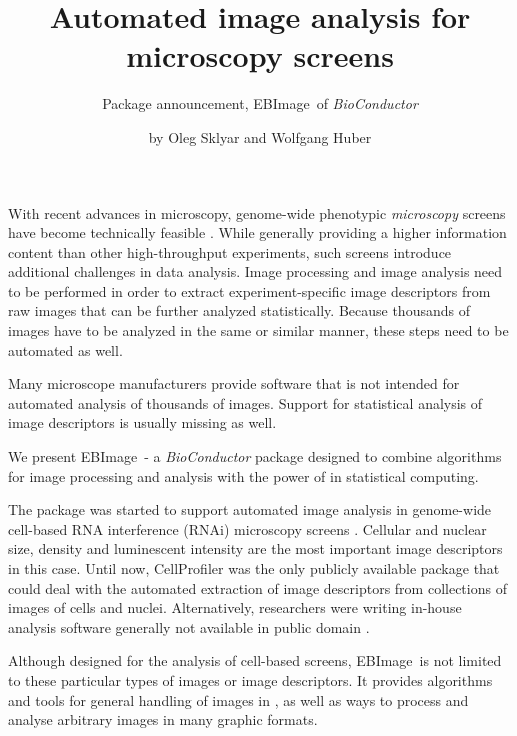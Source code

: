 
\newcommand{\lib}[1]{{\normalfont\textsf{#1}}}
\newcommand{\EBImage}{{\normalfont\textsf{EBImage}}}

\title{Automated image analysis for microscopy screens}
\subtitle{Package announcement, \EBImage\ of {\em BioConductor}}
\author{by Oleg Sklyar and Wolfgang Huber}

\maketitle

With recent advances in microscopy, genome-wide phenotypic {\em microscopy} screens have become technically feasible \citep{R:Neumann:2006}. While generally providing a higher information content than other high-throughput experiments, such screens introduce additional challenges in data analysis. Image processing and image analysis need to be performed in order to extract experiment-specific image descriptors from raw images that can be further analyzed statistically. Because thousands of images have to be analyzed in the same or similar manner, these steps need to be automated as well.

Many microscope manufacturers provide software that is not intended for automated analysis of thousands of images. Support for statistical analysis of image descriptors is usually missing as well.

We present \EBImage\ - a {\em BioConductor} package designed to combine algorithms for image processing and analysis with the power of \R{} in statistical computing.

The package was started to support automated image analysis in genome-wide cell-based RNA interference (RNAi) microscopy screens \citep{R:Fuchs+Boutros:2006}. Cellular and nuclear size, density and luminescent intensity are the most important image descriptors in this case. Until now, \lib{CellProfiler} \citep{R:Carpenter:prep} was the only publicly available package that could deal with the automated extraction of image descriptors from collections of images of cells and nuclei. Alternatively, researchers were writing in-house analysis software generally not available in public domain \citep{R:Neumann:2006}.

Although designed for the analysis of cell-based screens, \EBImage\ is not limited to these particular types of images or image descriptors. It provides algorithms and tools for general handling of images in \R{}, as well as ways to process and analyse arbitrary images in many graphic formats.

